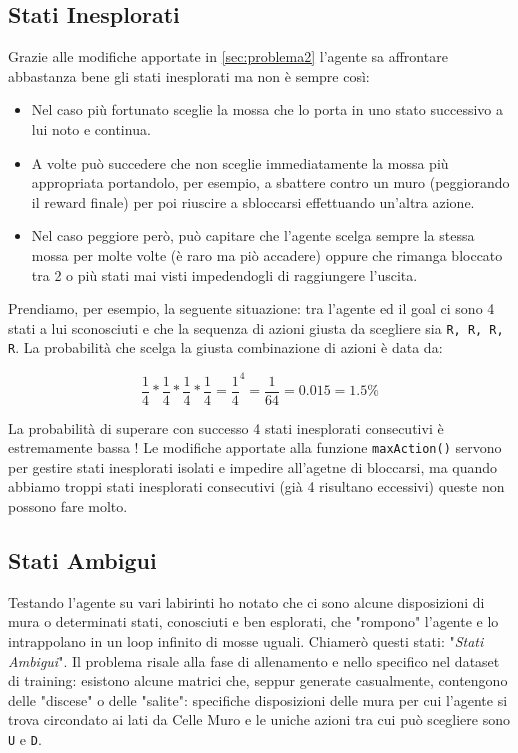 \subsection{Stati Inesplorati}
Grazie alle modifiche apportate in \autoref{sec:problema2} l'agente sa affrontare abbastanza bene gli stati inesplorati ma non \`{e} sempre cos\`{i}:

\begin{itemize}
	\item Nel caso pi\`{u} fortunato sceglie la mossa che lo porta in uno stato successivo a lui noto e continua.
	\item A volte pu\`{o} succedere che non sceglie immediatamente la mossa pi\`{u} appropriata portandolo, per esempio, a sbattere contro un muro (peggiorando il  reward finale) per poi riuscire a sbloccarsi effettuando un'altra azione.
	\item Nel caso peggiore per\`{o}, pu\`{o} capitare che l'agente scelga sempre la stessa mossa per molte volte (\`{e} raro ma pi\`{o} accadere) oppure che rimanga bloccato tra 2 o pi\`{u} stati mai visti impedendogli di raggiungere l'uscita.
\end{itemize}

Prendiamo, per esempio, la seguente situazione: tra l'agente ed il goal ci sono 4 stati a lui sconosciuti e che la sequenza di azioni giusta da scegliere sia \lstinline[style=cmd]|R, R, R, R|. La probabilit\`{a} che scelga la giusta combinazione di azioni \`{e} data da:

\[\frac{1}{4} * \frac{1}{4} * \frac{1}{4} * \frac{1}{4} = {\frac{1}{4}}^4 = \frac{1}{64} = 0.015 = 1.5\%\]

La probabilit\`{a} di superare con successo 4 stati inesplorati consecutivi \`{e} estremamente bassa ! Le modifiche apportate alla funzione \lstinline[style=cmd]|maxAction()| servono per gestire stati inesplorati isolati e impedire all'agetne di bloccarsi, ma quando abbiamo troppi stati inesplorati consecutivi (gi\`{a} 4 risultano eccessivi)  queste non possono fare molto.

\subsection{Stati Ambigui}

Testando l'agente su vari labirinti ho notato che ci sono alcune disposizioni di mura o determinati stati, conosciuti e ben esplorati, che "rompono" l'agente e lo intrappolano in un loop infinito di mosse uguali. Chiamer\`{o} questi stati: "\textit{Stati Ambigui}". Il problema risale alla fase di allenamento e nello specifico nel dataset di training: esistono alcune matrici che, seppur generate casualmente, contengono delle "discese" o delle "salite": specifiche disposizioni delle mura per cui l'agente si trova circondato ai lati da Celle Muro e le uniche azioni tra cui pu\`{o} scegliere sono \lstinline[style=cmd]|U| e \lstinline[style=cmd]|D|. 

